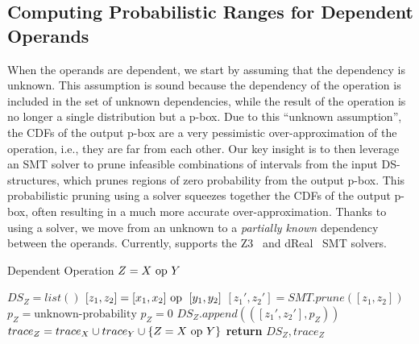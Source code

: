 \subsection{Computing Probabilistic Ranges for Dependent Operands}\label{subsec:dependentOperation}
%
When the operands are dependent, we start by assuming that the dependency is unknown.
%
This assumption is sound because the dependency of the operation is included in the set of unknown dependencies, while the result of the operation is no longer a single distribution but a p-box.
%
Due to this ``unknown assumption'', the CDFs of the output p-box are a very pessimistic over-approximation of the operation, i.e., they are far from each other.
%
%
Our key insight is to then leverage an SMT solver to prune infeasible combinations of intervals from the input DS-structures, which prunes regions of zero probability from the output p-box.
%
%
%
This probabilistic pruning using a solver squeezes together the CDFs of the output p-box, often resulting in a much more accurate over-approximation.
%
Thanks to using a solver, we move from an unknown to a \emph{partially known} dependency between the operands.
%
Currently, \Tool supports the Z3~\cite{Z3} and dReal~\cite{dReal} SMT solvers.


\begin{algorithm}[tb]
	\caption{Dependent Operation $Z=X~\mathrm{op}~ Y$}\label{dependentalg}
	\begin{algorithmic}[1]
		\State $DS_Z=list()$
		\State $[z_1, z_2]=[x_1, x_2] ~\mathrm{op}~\;[y_1, y_2]$ 
		\State $[z_1', z_2']=SMT.prune([z_1, z_2])$
		\State $p_Z=\mbox{unknown-probability}$
		\Else 
		\State $p_Z=0$
		\EndIf
		\State $DS_Z.append(([z_1', z_2'],p_Z))$
		\EndFor
		\EndFor
		\State $trace_Z=trace_X \cup trace_Y\cup\{Z=X~\mathrm{op}~ Y\}$
		\State \textbf{return} $DS_Z, trace_Z$
		\EndFunction
	\end{algorithmic}
\end{algorithm}


